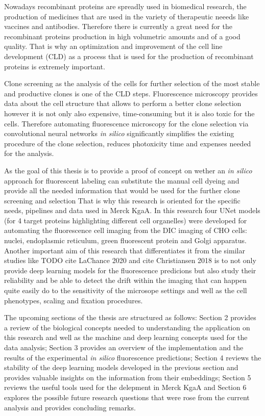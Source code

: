 Nowadays recombinant proteins are spreadly used in biomedical research, the production of medicines that are used in the variety of therapeutic neeeds like vaccines and antibodies. Therefore there is currently a great need for the recombinant proteins production in high volumetric amounts and of a good quality. That is why an optimization and improvement of the cell line development (CLD) as a process that is used for the production of recombinant proteins is extremely important.

Clone screening as the analysis of the cells for further selection of the most stable and productive clones is one of the CLD steps. Fluorescence microscopy provides data about the cell structure that allows to perform a better clone selection however it is not only also expensive, time-consuming but it is also toxic for the cells. Therefore automating fluorescence microscopy for the clone selection via convolutional neural networks  \textit{in silico} significantly simplifies the existing procedure of the clone selection, reduces photoxicity time and expenses needed for the analysis.

As the goal of this thesis is to provide a proof of concept on wether an \textit{in silico} approach for fluorescent labeling can substitute the manual cell dyeing and provide all the needed information that would be used for the further clone screening and selection That is why this research is oriented for the specific needs, pipelines and data used in Merck KgaA. In this research four UNet models (for 4 target proteins highlighting different cell organelles) were developed for automating the fluorescence cell imaging from the DIC imaging of CHO cells: nuclei, endoplasmic reticulum, green fluorescent protein and Golgi apparatus. Another important aim of this research that differentiates it from the similar studies like TODO cite LaChance 2020 and cite Christiansen 2018 is to not only provide deep learning models for the fluorescence predicions but also study their reliability and be able to detect the drift within the imaging that can happen quite easily do to the sensitivity of the microsope settings and well as the cell phenotypes, scaling and fixation procedures.

The upcoming sections of the thesis are structured as follows: Section 2 provides a review of the biological concepts needed to understanding the application on this research and well as the machine and deep learning concepts used for the data analysis; Section 3 provides an overview of the implementation and the results of the experimental \textit{in silico} fluorescence predictions; Section 4 reviews the stability of the deep learning models developed in the previous section and provides valuable insights on the information from their embeddings; Section 5 reviews the useful tools used for the delepment in Merck KgaA and Section 6 explores the possible future research questions that were rose from the current analysis and provides concluding remarks.
